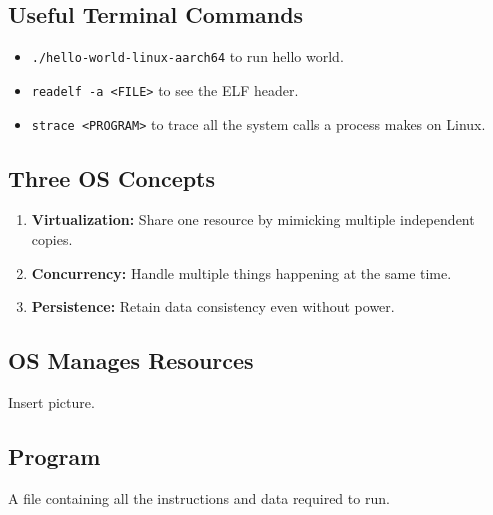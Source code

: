 \begin{summary}
    
\end{summary}

\subsection{Useful Terminal Commands}
\begin{summary}
    \begin{itemize}
        \item \texttt{./hello-world-linux-aarch64} to run hello world.
        \item \texttt{readelf -a <FILE>} to see the ELF header.
        \item \texttt{strace <PROGRAM>} to trace all the system calls a process makes on Linux.
    \end{itemize}
\end{summary}

\subsection{Three OS Concepts}
\begin{definition}
    \begin{enumerate}
        \item \textbf{Virtualization:} Share one resource by mimicking multiple independent copies.
        \item \textbf{Concurrency:} Handle multiple things happening at the same time.
        \item \textbf{Persistence:} Retain data consistency even without power. 
    \end{enumerate}
\end{definition}

\subsection{OS Manages Resources}
\begin{definition}
    Insert picture. 
\end{definition}

\subsection{Program}
\begin{definition}
    A file containing all the instructions and data required to run. 
\end{definition}

